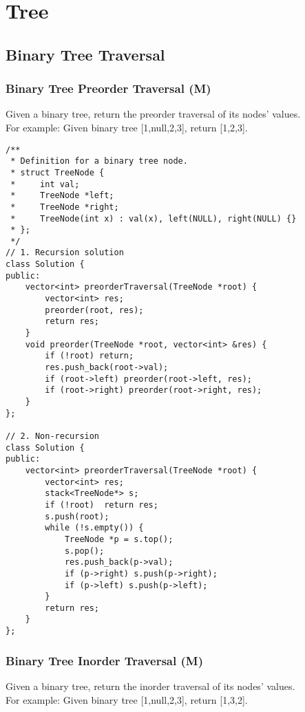 \chapter{Tree}
\section{Binary Tree Traversal}
\subsection{Binary Tree Preorder Traversal (M)}
Given a binary tree, return the preorder traversal of its nodes' values.\\

For example: Given binary tree [1,null,2,3], return [1,2,3]. \\

\begin{lstlisting}
/**
 * Definition for a binary tree node.
 * struct TreeNode {
 *     int val;
 *     TreeNode *left;
 *     TreeNode *right;
 *     TreeNode(int x) : val(x), left(NULL), right(NULL) {}
 * };
 */
// 1. Recursion solution
class Solution {
public:
    vector<int> preorderTraversal(TreeNode *root) {
        vector<int> res;
        preorder(root, res);
        return res;
    }
    void preorder(TreeNode *root, vector<int> &res) {
        if (!root) return;
        res.push_back(root->val);
        if (root->left) preorder(root->left, res);
        if (root->right) preorder(root->right, res);
    }
};

// 2. Non-recursion
class Solution {
public:
    vector<int> preorderTraversal(TreeNode *root) {
        vector<int> res;
        stack<TreeNode*> s;
        if (!root)  return res;
        s.push(root);
        while (!s.empty()) {
            TreeNode *p = s.top();
            s.pop();
            res.push_back(p->val);
            if (p->right) s.push(p->right);
            if (p->left) s.push(p->left);
        }
        return res;
    }
};
\end{lstlisting}


\subsection{Binary Tree Inorder Traversal (M)}
Given a binary tree, return the inorder traversal of its nodes' values. \\

For example: Given binary tree [1,null,2,3], return [1,3,2]. \\

